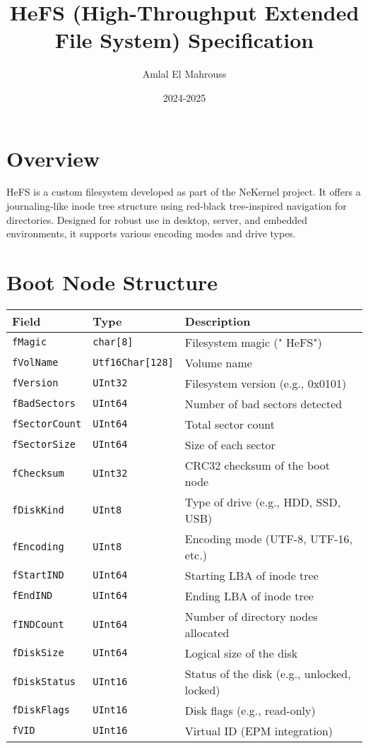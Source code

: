 \documentclass{article}
\title{HeFS (High-Throughput Extended File System) Specification}
\author{Amlal El Mahrouss}
\date{2024-2025}
\begin{document}
\maketitle

\section{Overview}
HeFS is a custom filesystem developed as part of the NeKernel project. It offers a journaling-like inode tree structure using red-black tree-inspired navigation for directories. Designed for robust use in desktop, server, and embedded environments, it supports various encoding modes and drive types.

\section{Boot Node Structure}
\begin{longtable}{|l|l|p{8cm}|}
\hline
\textbf{Field} & \textbf{Type} & \textbf{Description} \\
\hline
\verb|fMagic| & \verb|char[8]| & Filesystem magic ("  HeFS") \\
\verb|fVolName| & \verb|Utf16Char[128]| & Volume name \\
\verb|fVersion| & \verb|UInt32| & Filesystem version (e.g., 0x0101) \\
\verb|fBadSectors| & \verb|UInt64| & Number of bad sectors detected \\
\verb|fSectorCount| & \verb|UInt64| & Total sector count \\
\verb|fSectorSize| & \verb|UInt64| & Size of each sector \\
\verb|fChecksum| & \verb|UInt32| & CRC32 checksum of the boot node \\
\verb|fDiskKind| & \verb|UInt8| & Type of drive (e.g., HDD, SSD, USB) \\
\verb|fEncoding| & \verb|UInt8| & Encoding mode (UTF-8, UTF-16, etc.) \\
\verb|fStartIND| & \verb|UInt64| & Starting LBA of inode tree \\
\verb|fEndIND| & \verb|UInt64| & Ending LBA of inode tree \\
\verb|fINDCount| & \verb|UInt64| & Number of directory nodes allocated \\
\verb|fDiskSize| & \verb|UInt64| & Logical size of the disk \\
\verb|fDiskStatus| & \verb|UInt16| & Status of the disk (e.g., unlocked, locked) \\
\verb|fDiskFlags| & \verb|UInt16| & Disk flags (e.g., read-only) \\
\verb|fVID| & \verb|UInt16| & Virtual ID (EPM integration) \\
\hline
\end{longtable}
\end{document}

